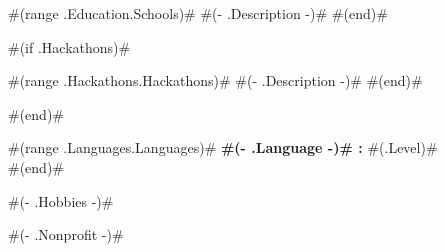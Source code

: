 \documentclass[8pt]{developercv} %
\begin{document}
\begin{entrylist}
	#(range .Education.Schools)#
	{ #(- .Description -)# }
#(end)#
\end{entrylist}


#(if .Hackathons)#
\begin{entrylist}
	#(range .Hackathons.Hackathons)#
	{ #(- .Description -)# }
	#(end)#
\end{entrylist}
#(end)#



\begin{minipage}[t]{0.3\textwidth}
	\vspace{-\baselineskip} %

	#(range .Languages.Languages)#\textbf{ #(- .Language -)# :} #(.Level)# \\
	#(end)#
\end{minipage}
\hfill
\begin{minipage}[t]{0.3\textwidth}
	\vspace{-\baselineskip} %
	
	#(- .Hobbies -)#
\end{minipage}
\hfill
\begin{minipage}[t]{0.3\textwidth}
	\vspace{-\baselineskip} %
	
	#(- .Nonprofit -)#
	
\end{minipage}

\end{document}
